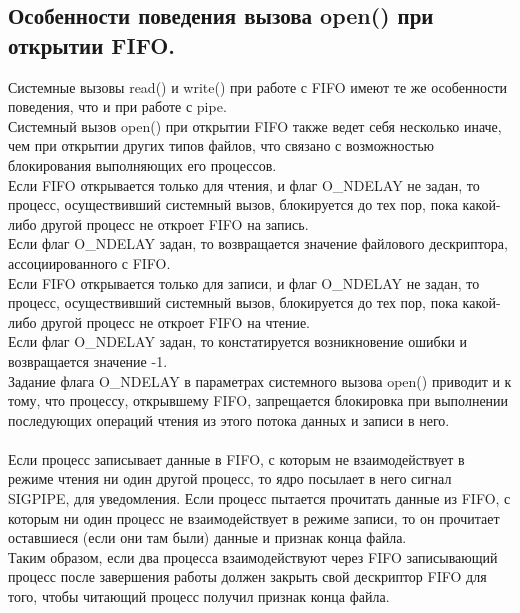 \documentclass[a4paper]{article}
\begin{document}
\subsection{\Large Особенности поведения вызова open() при открытии FIFO.}
Системные вызовы read() и write() при работе с FIFO имеют те же особенности поведения, что и при работе с pipe. \\
Системный вызов open() при открытии FIFO также ведет себя несколько иначе, чем при открытии других типов файлов, что связано с возможностью блокирования выполняющих его процессов. \\
Если FIFO открывается только для чтения, и флаг O\_NDELAY не задан, то процесс, осуществивший системный вызов, блокируется до тех пор, пока какой-либо другой процесс не откроет FIFO на запись. \\
Если флаг O\_NDELAY задан, то возвращается значение файлового дескриптора, ассоциированного с FIFO. \\
Если FIFO открывается только для записи, и флаг O\_NDELAY не задан, то процесс, осуществивший системный вызов, блокируется до тех пор, пока какой-либо другой процесс не откроет FIFO на чтение.\\
Если флаг O\_NDELAY задан, то констатируется возникновение ошибки и возвращается значение -1. \\
Задание флага O\_NDELAY в параметрах системного вызова open() приводит и к тому, что процессу, открывшему FIFO, запрещается блокировка при выполнении последующих операций чтения из этого потока данных и записи в него. \\\\
Если процесс записывает данные в FIFO, с которым не взаимодействует в режиме чтения ни один другой процесс, то ядро посылает в него сигнал SIGPIPE, для уведомления. Если процесс пытается прочитать данные из FIFO, с которым ни один процесс не взаимодействует в режиме записи, то он прочитает оставшиеся (если они там были) данные и признак конца файла. \\
Таким образом, если два процесса взаимодействуют через FIFO записывающий процесс после завершения работы должен закрыть свой дескриптор FIFO для того, чтобы читающий процесс получил признак конца файла.

\newpage
\end{document}
